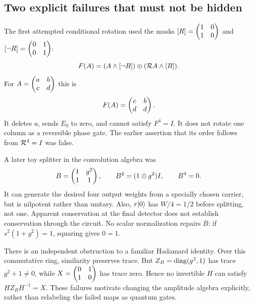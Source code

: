 \subsection{Two explicit failures that must not be hidden}
The first attempted conditional rotation used the masks $[R]=\begin{pmatrix}1&0\\1&0\end{pmatrix}$ and $[\neg R]=\begin{pmatrix}0&1\\0&1\end{pmatrix}$:
\begin{equation}
 F(A)=(A\land[\neg R])\oplus(\mathcal R A\land[R]).
\end{equation}
For $A=\begin{pmatrix}a&b\\c&d\end{pmatrix}$ this is
\begin{equation}\label{eq:badmask}
 F(A)=\begin{pmatrix}c&b\\d&d\end{pmatrix}.
\end{equation}
It deletes $a$, sends $E_0$ to zero, and cannot satisfy $F^4=I$. It does not rotate one column as a reversible phase gate. The earlier assertion that its order follows from $\mathcal R^4=I$ was false.

A later toy splitter in the convolution algebra was
\begin{equation}
 B=\begin{pmatrix}1&g^2\\1&1\end{pmatrix},\qquad B^2=(1\oplus g^2)I,
 \qquad B^4=0.
\end{equation}
It can generate the desired four output weights from a specially chosen carrier, but is nilpotent rather than unitary. Also, $r\lvert 0\rangle$ has $W/4=1/2$ before splitting, not one. Apparent conservation at the final detector does not establish conservation through the circuit. No scalar normalization repairs $B$: if $s^2(1+g^2)=1$, squaring gives $0=1$.

There is an independent obstruction to a familiar Hadamard identity. Over this commutative ring, similarity preserves trace. But $Z_B=\operatorname{diag}(g^2,1)$ has trace $g^2+1\ne0$, while $X=\begin{pmatrix}0&1\\1&0\end{pmatrix}$ has trace zero. Hence no invertible $H$ can satisfy $HZ_BH^{-1}=X$. These failures motivate changing the amplitude algebra explicitly, rather than relabeling the failed maps as quantum gates.
